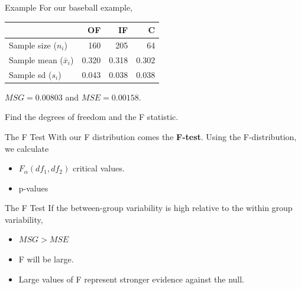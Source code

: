 \begin{frame}{Example}
    For our baseball example,
    \begin{table}[]
        \centering%
        \begin{tabular}{l rrr}
            \hline
            & OF & IF & C \\
            \hline
            Sample size ($n_i$) & 160 & 205 & 64 \\
            Sample mean ($\bar{x}_i$) & 0.320 & 0.318 & 0.302 \\
            Sample sd ($s_i$) & 0.043 & 0.038 & 0.038 \\
            \hline
        \end{tabular}
    \end{table}
    $MSG=0.00803$ and $MSE = 0.00158$. 
    
    \vspace{12pt}
    Find the degrees of freedom and the F statistic. 
\end{frame}

\begin{frame}{The F Test}
    With our F distribution comes the \textbf{F-test}. Using the F-distribution, we calculate
    \begin{itemize}
        \item $F_{\alpha}(df_1,df_2)$ critical values.
        \item p-values
    \end{itemize}
\end{frame}

\begin{frame}{The F Test}
    If the between-group variability is high relative to the within group variability,
    \begin{itemize}
        \item $MSG > MSE$
        \item F will be large.
        \item Large values of F represent stronger evidence against the null.
    \end{itemize}
\end{frame}

